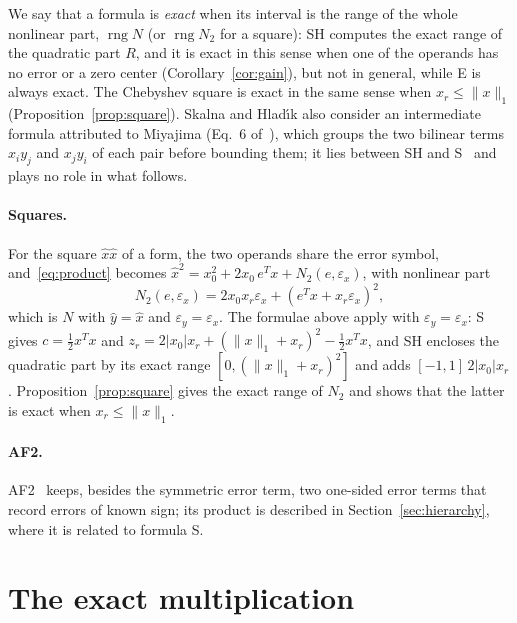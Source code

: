 \documentclass[11pt]{article}
\theoremstyle{definition}
\newcommand{\eps}{\varepsilon}
\newcommand{\ex}{\eps_x}
\newcommand{\ey}{\eps_y}
\newcommand{\rng}{\operatorname{rng}}
\begin{document}
We say that a formula is \emph{exact} when its interval is the range of the whole nonlinear part, $\rng N$ (or $\rng N_2$ for a square): SH computes the exact range of the quadratic part $R$, and it is exact in this sense when one of the operands has no error or a zero center (Corollary~\ref{cor:gain}), but not in general, while E is always exact. The Chebyshev square is exact in the same sense when $x_r\le\|x\|_1$ (Proposition~\ref{prop:square}). Skalna and Hlad\'{\i}k also consider an intermediate formula attributed to Miyajima (Eq.~6 of~\cite{skalna2017new}), which groups the two bilinear terms $x_iy_j$ and $x_jy_i$ of each pair before bounding them; it lies between SH and S~\cite[Prop.~3]{skalna2017new} and plays no role in what follows.

\paragraph{Squares.} For the square $\hat x\hat x$ of a form, the two operands share the error symbol, and~\eqref{eq:product} becomes $\hat x^2=x_0^2+2x_0\,e^Tx+N_2(e,\ex)$, with nonlinear part
\begin{equation}
\label{eq:N2}
N_2(e,\ex)=2x_0x_r\ex+(e^Tx+x_r\ex)^2 ,
\end{equation}
which is $N$ with $\hat y=\hat x$ and $\ey=\ex$. The formulae above apply with $\ey=\ex$: S gives $c=\tfrac12x^Tx$ and $z_r=2|x_0|x_r+(\|x\|_1+x_r)^2-\tfrac12x^Tx$, and SH encloses the quadratic part by its exact range $[0,(\|x\|_1+x_r)^2]$ and adds $[-1,1]\,2|x_0|x_r$. Proposition~\ref{prop:square} gives the exact range of $N_2$ and shows that the latter is exact when $x_r\le\|x\|_1$.

\paragraph{AF2.} AF2~\cite{messine2002extentions} keeps, besides the symmetric error term, two one-sided error terms that record errors of known sign; its product is described in Section~\ref{sec:hierarchy}, where it is related to formula S.

\section{The exact multiplication}
\label{sec:exact}
\end{document}
